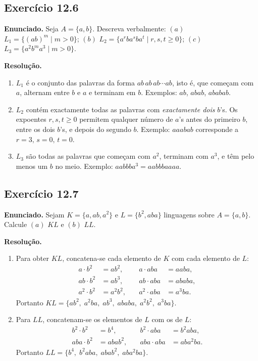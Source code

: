 \documentclass[12pt,a4paper]{article}
\begin{document}
\subsection*{Exercício 12.6}

\textbf{Enunciado.} Seja $A = \{a,b\}$. Descreva verbalmente:
$(a)$\; $L_1 = \{(ab)^m \mid m > 0\}$;\quad
$(b)$\; $L_2 = \{a^r b a^s b a^t \mid r,s,t \ge 0\}$;\quad
$(c)$\; $L_3 = \{a^2 b^m a^3 \mid m > 0\}$.

\medskip
\textbf{Resolução.}

\begin{enumerate}[label=(\alph*)]
  \item $L_1$ é o conjunto das palavras da forma $ab\,ab\,ab\cdots ab$, isto é, que
        começam com $a$, alternam entre $b$ e $a$ e terminam em $b$.
        Exemplos: $ab$, $abab$, $ababab$.

  \item $L_2$ contém exactamente todas as palavras com \emph{exactamente dois} $b$'s.
        Os expoentes $r,s,t \ge 0$ permitem qualquer número de $a$'s antes do primeiro
        $b$, entre os dois $b$'s, e depois do segundo $b$.
        Exemplo: $aaabab$ corresponde a $r=3,\,s=0,\,t=0$.

  \item $L_3$ são todas as palavras que começam com $a^2$, terminam com $a^3$, e têm
        pelo menos um $b$ no meio.
        Exemplo: $aabbba^3 = aabbbaaaa$.
\end{enumerate}

\subsection*{Exercício 12.7}

\textbf{Enunciado.} Sejam $K = \{a, ab, a^2\}$ e $L = \{b^2, aba\}$ linguagens sobre
$A = \{a,b\}$. Calcule $(a)$ $KL$ e $(b)$ $LL$.

\medskip
\textbf{Resolução.}

\begin{enumerate}[label=(\alph*)]
  \item Para obter $KL$, concatena-se cada elemento de $K$ com cada elemento de $L$:
  \begin{align*}
    a \cdot b^2 &= ab^2,\quad & a \cdot aba &= aaba,\\
    ab \cdot b^2 &= ab^3,\quad & ab \cdot aba &= ababa,\\
    a^2 \cdot b^2 &= a^2b^2,\quad & a^2 \cdot aba &= a^3ba.
  \end{align*}
  Portanto $KL = \{ab^2,\; a^2ba,\; ab^3,\; ababa,\; a^2b^2,\; a^3ba\}$.

  \item Para $LL$, concatenam-se os elementos de $L$ com os de $L$:
  \begin{align*}
    b^2 \cdot b^2 &= b^4,\quad & b^2 \cdot aba &= b^2aba,\\
    aba \cdot b^2 &= abab^2,\quad & aba \cdot aba &= aba^2ba.
  \end{align*}
  Portanto $LL = \{b^4,\; b^2aba,\; abab^2,\; aba^2ba\}$.
\end{enumerate}
\end{document}
